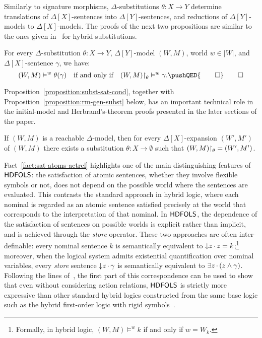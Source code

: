 \documentclass[a4paper,UKenglish,cleveref,autoref]{lipics-v2019}
\begin{document}
Similarly to signature morphisms, \(\Delta\)-substitutions \(\theta \colon X \to Y\) determine translations of \(\Delta[X]\)-sentences into \(\Delta[Y]\)-sentences, and reductions of \(\Delta[Y]\)-models to \(\Delta[X]\)-models.
The proofs of the next two propositions are similar to the ones given in~\cite{Gaina17Her} for hybrid substitutions.

\begin{proposition}
  \label{proposition:subst-sat-cond}
  For every \(\Delta\)-substitution \(\theta \colon X \to Y\), \(\Delta[Y]\)-model \((W, M)\), world \(w \in |W|\), and \(\Delta[X]\)-sentence \(\gamma\), we have:
  \[
    (W, M) \models^{w} \theta(\gamma)
    \quad\text{if and only if}\quad
    (W, M) \red_{\theta} \models^{w} \gamma.
    \pushQED{\qed}\qedhere
  \]
\end{proposition} 

Proposition~\ref{proposition:subst-sat-cond}, together with Proposition~\ref{proposition:rm-gen-subst} below, has an important technical role in the initial-model and Herbrand's-theorem proofs presented in the later sections of the paper.

\begin{proposition} 
  \label{proposition:rm-gen-subst}
  If \((W, M)\) is a reachable \(\Delta\)-model, then for every \(\Delta[X]\)-expansion \((W', M')\) of \((W, M)\) there exists a substitution \(\theta \colon X \to \emptyset\) such that \((W, M) \mathord{\upharpoonright}_{\theta} = (W', M')\).
  \pushQED{\qed}\qedhere
\end{proposition}

Fact~\ref{fact:sat-atoms-actrel} highlights one of the main distinguishing features of \({\mathsf{HDFOLS}}\):
the satisfaction of atomic sentences, whether they involve flexible symbols or not, does not depend on the possible world where the sentences are evaluated.
This contrasts the standard approach in hybrid logic, where each nominal is regarded as an atomic sentence satisfied precisely at the world that corresponds to the interpretation of that nominal.
In \({\mathsf{HDFOLS}}\), the dependence of the satisfaction of sentences on possible worlds is explicit rather than implicit, and is achieved through the \emph{store} operator.
These two approaches are often inter-definable:
every nominal sentence \(k\) is semantically equivalent to \({\downarrow}z\,{\cdot}\, z = k\);\footnote{Formally, in hybrid logic, \((W, M) \models^{w} k\) if and only if \(w = W_{k}\).}
moreover, when the logical system admits existential quantification over nominal variables, every \emph{store} sentence \({\downarrow}z\,{\cdot}\, \gamma\) is semantically equivalent to \(\exists z\,{\cdot}\, (z \land \gamma)\).
Following the lines of~\cite[Section~4.3]{Gaina17Her}, the first part of this correspondence can be used to show that even without considering action relations, \({\mathsf{HDFOLS}}\) is strictly more expressive than other standard hybrid logics constructed from the same base logic such as the hybrid first-order logic with rigid symbols~\cite{DiaconescuM16,Diaconescu16}.
\end{document}
